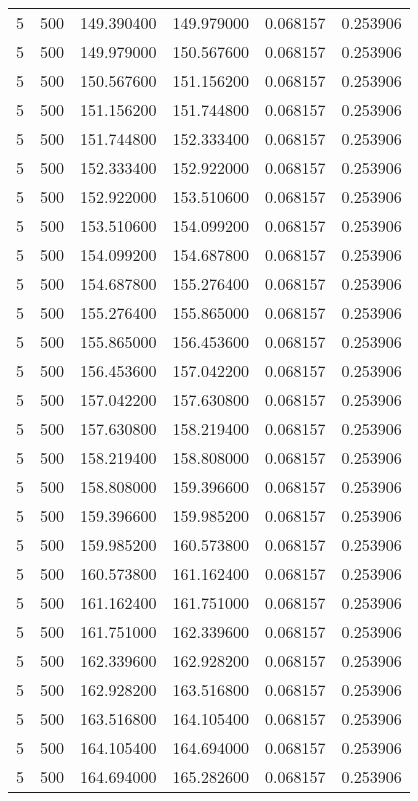 \begin{longtable}{rrrrrr}
5 & 500 & 149.390400 & 149.979000 & 0.068157 & 0.253906 \\
5 & 500 & 149.979000 & 150.567600 & 0.068157 & 0.253906 \\
5 & 500 & 150.567600 & 151.156200 & 0.068157 & 0.253906 \\
5 & 500 & 151.156200 & 151.744800 & 0.068157 & 0.253906 \\
5 & 500 & 151.744800 & 152.333400 & 0.068157 & 0.253906 \\
5 & 500 & 152.333400 & 152.922000 & 0.068157 & 0.253906 \\
5 & 500 & 152.922000 & 153.510600 & 0.068157 & 0.253906 \\
5 & 500 & 153.510600 & 154.099200 & 0.068157 & 0.253906 \\
5 & 500 & 154.099200 & 154.687800 & 0.068157 & 0.253906 \\
5 & 500 & 154.687800 & 155.276400 & 0.068157 & 0.253906 \\
5 & 500 & 155.276400 & 155.865000 & 0.068157 & 0.253906 \\
5 & 500 & 155.865000 & 156.453600 & 0.068157 & 0.253906 \\
5 & 500 & 156.453600 & 157.042200 & 0.068157 & 0.253906 \\
5 & 500 & 157.042200 & 157.630800 & 0.068157 & 0.253906 \\
5 & 500 & 157.630800 & 158.219400 & 0.068157 & 0.253906 \\
5 & 500 & 158.219400 & 158.808000 & 0.068157 & 0.253906 \\
5 & 500 & 158.808000 & 159.396600 & 0.068157 & 0.253906 \\
5 & 500 & 159.396600 & 159.985200 & 0.068157 & 0.253906 \\
5 & 500 & 159.985200 & 160.573800 & 0.068157 & 0.253906 \\
5 & 500 & 160.573800 & 161.162400 & 0.068157 & 0.253906 \\
5 & 500 & 161.162400 & 161.751000 & 0.068157 & 0.253906 \\
5 & 500 & 161.751000 & 162.339600 & 0.068157 & 0.253906 \\
5 & 500 & 162.339600 & 162.928200 & 0.068157 & 0.253906 \\
5 & 500 & 162.928200 & 163.516800 & 0.068157 & 0.253906 \\
5 & 500 & 163.516800 & 164.105400 & 0.068157 & 0.253906 \\
5 & 500 & 164.105400 & 164.694000 & 0.068157 & 0.253906 \\
5 & 500 & 164.694000 & 165.282600 & 0.068157 & 0.253906 \\

\end{longtable}

